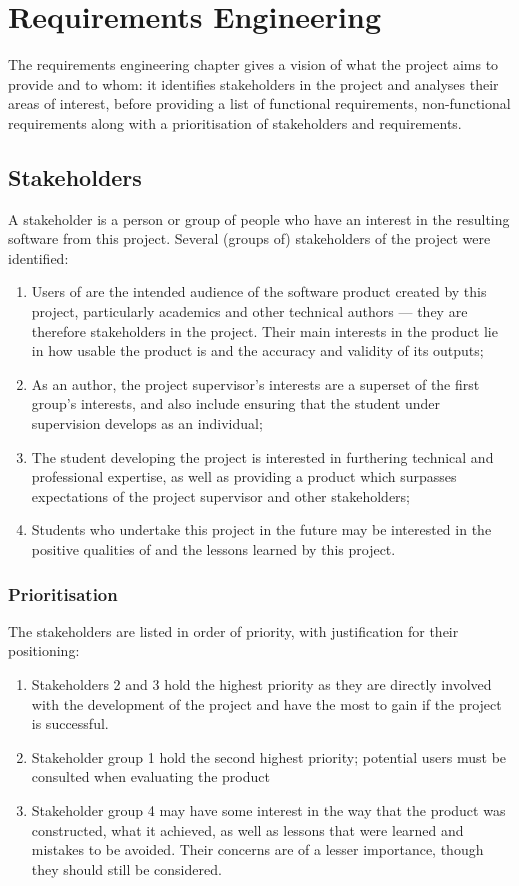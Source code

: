 \chapter{Requirements Engineering}
\label{reqs}
The requirements engineering chapter gives a vision of what the project aims to provide and to whom: it identifies stakeholders in the project and analyses their areas of interest, before providing a list of functional requirements, non-functional requirements along with a prioritisation of stakeholders and requirements.

\section{Stakeholders}
A stakeholder is a person or group of people who have an interest in the resulting software from this project.  Several (groups of) stakeholders of the project were identified:

\begin{enumerate}
	\item Users of \bibtex{} are the intended audience of the software product created by this project, particularly academics and other technical authors --- they are therefore stakeholders in the project.  Their main interests in the product lie in how usable the product is and the accuracy and validity of its outputs;
	\item As an author, the project supervisor's interests are a superset of the first group's interests, and also include ensuring that the student under supervision develops as an individual;
	\item The student developing the project is interested in furthering technical and professional expertise, as well as providing a product which surpasses expectations of the project supervisor and other stakeholders;
	\item Students who undertake this project in the future may be interested in the positive qualities of and the lessons learned by this project.
\end{enumerate}

\subsection*{Prioritisation}
The stakeholders are listed in order of priority, with justification for their positioning:
\begin{enumerate}
	\item Stakeholders 2 and 3 hold the highest priority as they are directly involved with the development of the project and have the most to gain if the project is successful.
	\item Stakeholder group 1 hold the second highest priority; potential users must be consulted when evaluating the product
	\item Stakeholder group 4 may have some interest in the way that the product was constructed, what it achieved, as well as lessons that were learned and mistakes to be avoided.  Their concerns are of a lesser importance, though they should still be considered.
\end{enumerate}

